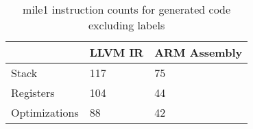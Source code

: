 \begin{table}[h!]
\centering
\begin{tabular}{p{}p{}p{}}
  \hline
 & LLVM IR & ARM Assembly \\ 
  \hline
Stack & 117 &  75 \\ 
  Registers & 104 &  44 \\ 
  Optimizations &  88 &  42 \\ 
   \hline
\end{tabular}
\caption{mile1 instruction counts for generated code excluding labels}
\end{table}
